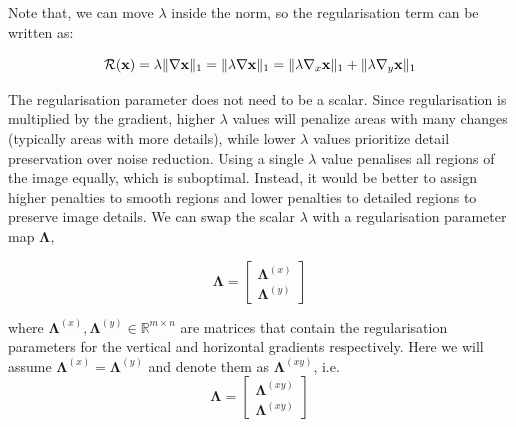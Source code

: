\documentclass[12pt]{article}
\begin{document}
Note that, we can move $\lambda$ inside the norm, so the regularisation term can be written as:

\begin{equation}
    \mathcal{R}(\mathbf{x}) 
    = \lambda \| \nabla \mathbf{x} \|_1 \\
    = \| \lambda \nabla \mathbf{x} \|_1 \\
    = \| \lambda \nabla_x \mathbf{x} \|_1 + \| \lambda \nabla_y \mathbf{x} \|_1
\end{equation}


The regularisation parameter does not need to be a scalar.
Since regularisation is multiplied by the gradient, higher $\lambda$ values will penalize areas with many changes (typically areas with more details), while lower $\lambda$ values prioritize detail preservation over noise reduction.
Using a single $\lambda$ value penalises all regions of the image equally, which is suboptimal. Instead, it would be better to assign higher penalties to smooth regions and lower penalties to detailed regions to preserve image details.
We can swap the scalar $\lambda$ with a regularisation parameter map $\mathbf{\Lambda}$,

\begin{equation}
  \mathbf{\Lambda} = \begin{bmatrix}
    \mathbf{\Lambda}^{(x)} \\
    \mathbf{\Lambda}^{(y)}
  \end{bmatrix}
\end{equation}

where $\mathbf{\Lambda}^{(x)}, \mathbf{\Lambda}^{(y)} \in \mathbb{R}^{m \times n}$ are matrices that contain the regularisation parameters for the vertical and horizontal gradients respectively.
Here we will assume $\mathbf{\Lambda}^{(x)} = \mathbf{\Lambda}^{(y)}$ and denote them as $\mathbf{\Lambda}^{(xy)}$, i.e.
\begin{equation}
  \mathbf{\Lambda} = \begin{bmatrix}
    \mathbf{\Lambda}^{(xy)} \\
    \mathbf{\Lambda}^{(xy)}
  \end{bmatrix}
\end{equation}
\end{document}
